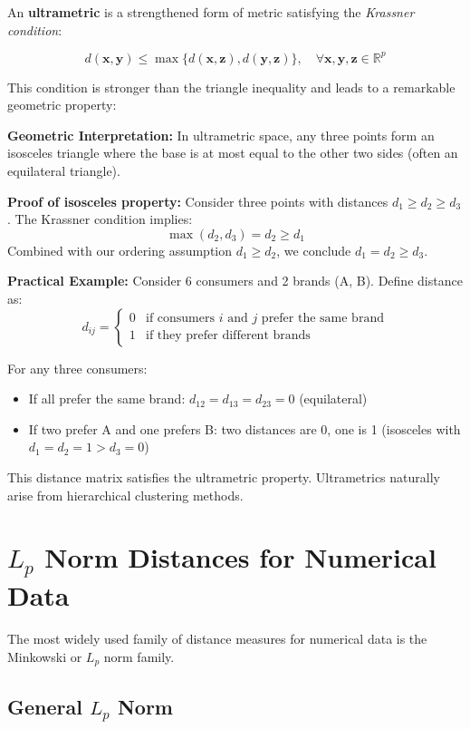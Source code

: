 \documentclass[11pt]{article}
\begin{document}
An \textbf{ultrametric} is a strengthened form of metric satisfying the \textit{Krassner condition}:

$$d(\mathbf{x}, \mathbf{y}) \leq \max\{d(\mathbf{x}, \mathbf{z}), d(\mathbf{y}, \mathbf{z})\}, \quad \forall \mathbf{x}, \mathbf{y}, \mathbf{z} \in \mathbb{R}^p$$

This condition is stronger than the triangle inequality and leads to a remarkable geometric property:

\textbf{Geometric Interpretation:} In ultrametric space, any three points form an isosceles triangle where the base is at most equal to the other two sides (often an equilateral triangle).

\textbf{Proof of isosceles property:} Consider three points with distances $d_1 \geq d_2 \geq d_3$. The Krassner condition implies:
$$\max(d_2, d_3) = d_2 \geq d_1$$
Combined with our ordering assumption $d_1 \geq d_2$, we conclude $d_1 = d_2 \geq d_3$.

\textbf{Practical Example:} Consider 6 consumers and 2 brands (A, B). Define distance as:
$$d_{ij} = \begin{cases} 0 & \text{if consumers } i \text{ and } j \text{ prefer the same brand} \\ 1 & \text{if they prefer different brands} \end{cases}$$

For any three consumers:
\begin{itemize}
    \item If all prefer the same brand: $d_{12} = d_{13} = d_{23} = 0$ (equilateral)
    \item If two prefer A and one prefers B: two distances are 0, one is 1 (isosceles with $d_1 = d_2 = 1 > d_3 = 0$)
\end{itemize}

This distance matrix satisfies the ultrametric property. Ultrametrics naturally arise from hierarchical clustering methods.

\section{$L_p$ Norm Distances for Numerical Data}

The most widely used family of distance measures for numerical data is the Minkowski or $L_p$ norm family.

\subsection{General $L_p$ Norm}
\end{document}

